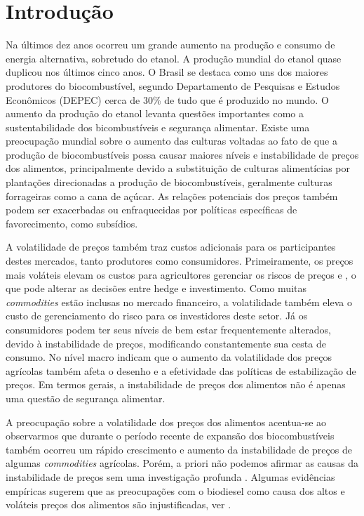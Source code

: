 	\section{Introdução}


Na últimos dez anos ocorreu um grande aumento na produção e consumo de energia alternativa, sobretudo do etanol. A produção mundial do etanol quase duplicou nos últimos cinco anos. O Brasil se destaca como uns dos maiores produtores do  biocombustível, segundo Departamento de Pesquisas e Estudos Econômicos (DEPEC) cerca de 30\%  de tudo que é produzido no mundo. O aumento da produção do etanol levanta questões importantes como a sustentabilidade dos bicombustíveis e  segurança alimentar. Existe uma preocupação mundial sobre o aumento das culturas voltadas ao fato de que a produção de biocombustíveis possa causar  maiores níveis e  instabilidade de preços dos alimentos, principalmente devido a substituição de culturas alimentícias por  plantações direcionadas a produção de biocombustíveis, geralmente culturas forrageiras como a cana de açúcar.   As relações potenciais dos preços também podem ser exacerbadas ou enfraquecidas por políticas específicas de favorecimento, como subsídios.

A volatilidade de preços também traz custos adicionais para os participantes destes  mercados, tanto produtores como consumidores. Primeiramente, os preços mais  voláteis  elevam os custos para agricultores gerenciar os riscos de preços   e , o que pode alterar as decisões entre hedge e investimento. Como muitas \emph{commodities} estão inclusas no mercado financeiro, a volatilidade  também eleva o custo de gerenciamento do risco para os investidores deste setor.  Já os consumidores podem ter seus níveis de bem estar frequentemente alterados, devido à instabilidade de preços, modificando constantemente sua cesta de consumo. No nível macro  indicam que o aumento da volatilidade dos preços agrícolas também afeta o desenho e a efetividade das políticas de estabilização de preços. Em termos gerais, a instabilidade de preços dos alimentos não é apenas uma questão de segurança alimentar. 

 A preocupação sobre a volatilidade dos preços dos alimentos acentua-se ao observarmos que durante o período recente de  expansão dos biocombustíveis também ocorreu um rápido crescimento e aumento da instabilidade de preços  de algumas \emph{commodities} agrícolas. Porém, a priori não podemos afirmar as causas da instabilidade de preços sem uma investigação profunda . Algumas evidências empíricas sugerem que as preocupações com o biodiesel como causa dos altos e voláteis  preços dos alimentos são injustificadas, ver   .
 

